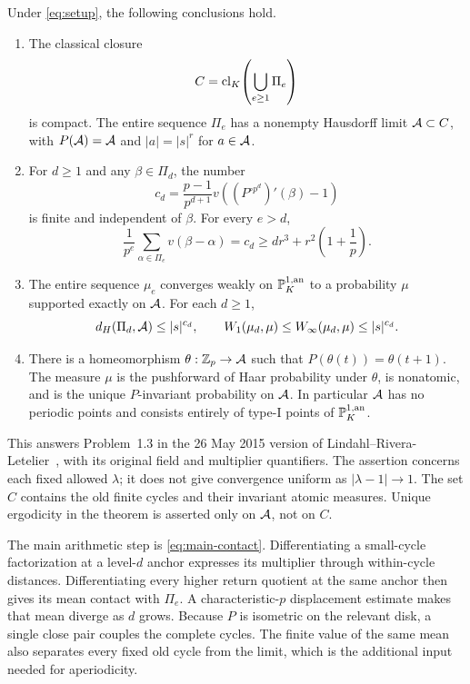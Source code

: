 \begin{theorem}
\label{thm:compact-adding-machine}
Under \eqref{eq:setup}, the following conclusions hold.
\begin{enumerate}[label=\textup{(\roman*)},leftmargin=*]
\item The classical closure
\[
 C=\operatorname{cl}_K\!\left(\bigcup_{e\ge1}\Pi_e\right)
\]
is compact. The entire sequence $\Pi_e$ has a nonempty Hausdorff limit
$\mathcal A\subset C$, with $P(\mathcal A)=\mathcal A$ and $|a|=|s|^r$ for $a\in\mathcal A$.
\item For $d\ge1$ and any $\beta\in\Pi_d$, the number
\begin{equation}\label{eq:main-cd}
 c_d=\frac{p-1}{p^{d+1}}
       v\!\left((P^{\circ p^d})'(\beta)-1\right)
\end{equation}
is finite and independent of $\beta$. For every $e>d$,
\begin{equation}\label{eq:main-contact}
 \frac1{p^e}\sum_{\alpha\in\Pi_e}v(\beta-\alpha)
 =c_d\ge d r^3+r^2\left(1+\frac1p\right).
\end{equation}
\item The entire sequence $\mu_e$ converges weakly on $\mathbb P^{1,\mathrm{an}}_K$ to a
probability $\mu$ supported exactly on $\mathcal A$. For each $d\ge1$,
\begin{equation}\label{eq:main-rate}
 d_H(\Pi_d,\mathcal A)\le |s|^{c_d},\qquad
 W_1(\mu_d,\mu)\le W_\infty(\mu_d,\mu)\le |s|^{c_d}.
\end{equation}
\item There is a homeomorphism $\theta:\mathbb Z_p\to\mathcal A$ such that
$P(\theta(t))=\theta(t+1)$. The measure $\mu$ is the pushforward
of Haar probability under $\theta$, is nonatomic, and is the unique
$P$-invariant probability on $\mathcal A$. In particular $\mathcal A$ has no
periodic points and consists entirely of type-I points of $\mathbb P^{1,\mathrm{an}}_K$.
\end{enumerate}
\end{theorem}

This answers Problem~1.3 in the 26 May 2015 version of
Lindahl--Rivera-Letelier~\cite{lindahl2016optimal}, with its original
field and multiplier quantifiers. The assertion concerns each fixed
allowed $\lambda$; it does not give convergence uniform as
$|\lambda-1|\to1$. The set $C$ contains the old finite cycles and
their invariant atomic measures. Unique ergodicity in the theorem is
asserted only on $\mathcal A$, not on $C$.

The main arithmetic step is \eqref{eq:main-contact}. Differentiating
a small-cycle factorization at a level-$d$ anchor expresses its
multiplier through within-cycle distances. Differentiating every
higher return quotient at the same anchor then gives its mean contact
with $\Pi_e$. A characteristic-$p$ displacement estimate makes that
mean diverge as $d$ grows. Because $P$ is isometric on the relevant
disk, a single close pair couples the complete cycles. The finite
value of the same mean also separates every fixed old cycle from
the limit, which is the additional input needed for aperiodicity.


